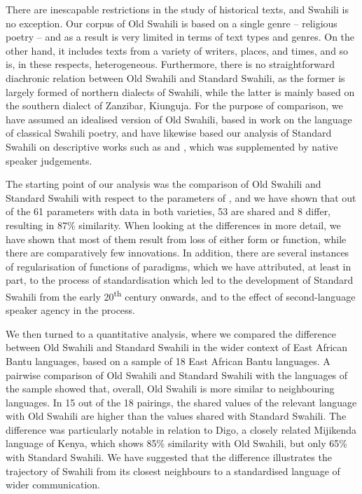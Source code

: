 \documentclass[output=paper]{langscibook}
\begin{document}
  There are inescapable restrictions in the study of historical texts, and Swahili is no exception. Our corpus of Old Swahili is based on a single genre -- religious poetry -- and as a result is very limited in terms of text types and genres. On the other hand, it includes texts from a variety of writers, places, and times, and so is, in these respects, heterogeneous. Furthermore, there is no straightforward diachronic relation between Old Swahili and Standard Swahili, as the former is largely formed of northern dialects of Swahili, while the latter is mainly based on the southern dialect of Zanzibar, Kiunguja. For the purpose of comparison, we have assumed an idealised version of Old Swahili, based in  work on the language of classical Swahili poetry, and have likewise based our analysis of Standard Swahili on descriptive works such as \citet{Ashton1947} and \citet{Schadeberg1992}, which was supplemented by native speaker judgements. 

  The starting point of our analysis was the comparison of Old Swahili and Standard Swahili with respect to the parameters of \citet{GuéroisEtAl2017}, and we have shown that out of the 61 parameters with data in both varieties, 53 are shared and 8 differ, resulting in 87\% similarity. When looking at the differences in more detail, we have shown that most of them result from loss of either form or function, while there are comparatively few innovations. In addition, there are several instances of regularisation of functions of paradigms, which we have attributed, at least in part, to the process of standardisation which led to the development of Standard Swahili from the early 20\textsuperscript{th} century onwards, and to the effect of second-language speaker agency in the process. 

  We then turned to a quantitative analysis, where we compared the difference between Old Swahili and Standard Swahili in the wider context of East African Bantu languages, based on a sample of 18 East African Bantu languages. A pairwise comparison of Old Swahili and Standard Swahili with the languages of the sample showed that, overall, Old Swahili is more similar to neighbouring languages. In 15 out of the 18 pairings, the shared values of the relevant language with Old Swahili are higher than the values shared with Standard Swahili. The difference was particularly notable in relation to Digo, a closely related Mijikenda language of Kenya, which shows 85\% similarity with Old Swahili, but only 65\% with Standard Swahili. We have suggested that the difference illustrates the trajectory of Swahili from its closest neighbours to a standardised language of wider communication. 
\end{document}
